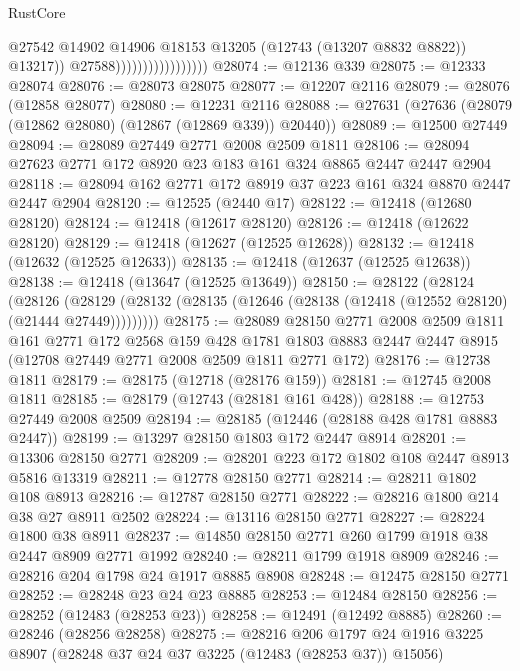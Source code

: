 \begin{lexlean}{RustCore}
\begin{coremodule}
                                          @27542
                                          @14902
                                          @14906
                                          @18153
                                          @13205
                                          (@12743 (@13207 @8832 @8822))
                                          @13217))
                                      @27588)))))))))))))))))
@28074 := @12136 @339
@28075 := @12333 @28074
@28076 := @28073 @28075
@28077 := @12207 @2116
@28079 := @28076 (@12858 @28077)
@28080 := @12231 @2116
@28088 := @27631 (@27636 (@28079 (@12862 @28080) (@12867 (@12869 @339)) @20440))
@28089 := @12500 @27449
@28094 := @28089 @27449 @2771 @2008 @2509 @1811
@28106 := @28094 @27623 @2771 @172 @8920 @23 @183 @161 @324 @8865 @2447 @2447 @2904
@28118 := @28094 @162 @2771 @172 @8919 @37 @223 @161 @324 @8870 @2447 @2447 @2904
@28120 := @12525 (@2440 @17)
@28122 := @12418 (@12680 @28120)
@28124 := @12418 (@12617 @28120)
@28126 := @12418 (@12622 @28120)
@28129 := @12418 (@12627 (@12525 @12628))
@28132 := @12418 (@12632 (@12525 @12633))
@28135 := @12418 (@12637 (@12525 @12638))
@28138 := @12418 (@13647 (@12525 @13649))
@28150 := @28122
    (@28124
      (@28126
        (@28129 (@28132 (@28135 (@12646 (@28138 (@12418 (@12552 @28120) (@21444 @27449)))))))))
@28175 := @28089
    @28150
    @2771
    @2008
    @2509
    @1811
    @161
    @2771
    @172
    @2568
    @159
    @428
    @1781
    @1803
    @8883
    @2447
    @2447
    @8915
    (@12708 @27449 @2771 @2008 @2509 @1811 @2771 @172)
@28176 := @12738 @1811
@28179 := @28175 (@12718 (@28176 @159))
@28181 := @12745 @2008 @1811
@28185 := @28179 (@12743 (@28181 @161 @428))
@28188 := @12753 @27449 @2008 @2509
@28194 := @28185 (@12446 (@28188 @428 @1781 @8883 @2447))
@28199 := @13297 @28150 @1803 @172 @2447 @8914
@28201 := @13306 @28150 @2771
@28209 := @28201 @223 @172 @1802 @108 @2447 @8913 @5816 @13319
@28211 := @12778 @28150 @2771
@28214 := @28211 @1802 @108 @8913
@28216 := @12787 @28150 @2771
@28222 := @28216 @1800 @214 @38 @27 @8911 @2502
@28224 := @13116 @28150 @2771
@28227 := @28224 @1800 @38 @8911
@28237 := @14850 @28150 @2771 @260 @1799 @1918 @38 @2447 @8909 @2771 @1992
@28240 := @28211 @1799 @1918 @8909
@28246 := @28216 @204 @1798 @24 @1917 @8885 @8908
@28248 := @12475 @28150 @2771
@28252 := @28248 @23 @24 @23 @8885
@28253 := @12484 @28150
@28256 := @28252 (@12483 (@28253 @23))
@28258 := @12491 (@12492 @8885)
@28260 := @28246 (@28256 @28258)
@28275 := @28216
    @206
    @1797
    @24
    @1916
    @3225
    @8907
    (@28248 @37 @24 @37 @3225 (@12483 (@28253 @37)) @15056)

\end{coremodule}
\end{lexlean}
